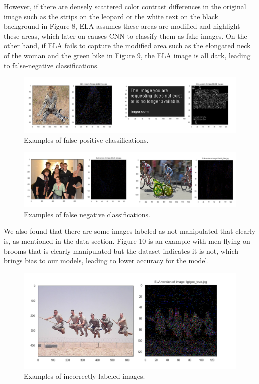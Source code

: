 \documentclass[11pt]{article}
\begin{document}
However, if there are densely scattered color contrast differences in the original image such as the strips on the leopard or the white text on the black background in Figure 8, ELA  assumes these areas are modified and highlight these areas, which later on causes CNN to classify them as fake images. On the other hand, if ELA fails to capture the modified area such as the elongated neck of the woman and the green bike in Figure 9, the ELA image is all dark, leading to false-negative classifications.

\begin{figure}[!htb]
    \centering
        \includegraphics[scale=.42]{figures/figure_10.png}
    \caption{Examples of false positive classifications.}
    \label{fig:8}
\end{figure}

\begin{figure}[!htb]
    \centering
        \includegraphics[scale=.42]{figures/figure_11.png}
    \caption{Examples of false negative classifications.}
    \label{fig:9}
\end{figure}

We also found that there are some images labeled as not manipulated that clearly is, as mentioned in the data section. Figure 10 is an example with men flying on brooms that is clearly manipulated but the dataset indicates it is not, which brings bias to our models, leading to lower accuracy for the model.

\begin{figure}[!htb]
    \centering
        \includegraphics[scale=.75]{figures/figure_12.png}
    \caption{Examples of incorrectly labeled images.}
    \label{fig:10}
\end{figure}
\end{document}
